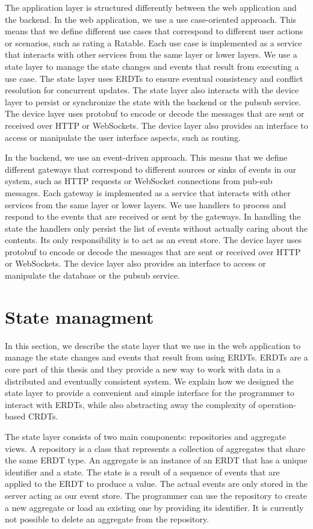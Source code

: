 \documentclass[
	english,
	ruledheaders=section,   %
	class=report,		    %
	thesis={type=bachelor}, %
	accentcolor=9c,			%
	custommargins=true,    %
	marginpar=false,        %
	parskip=half-,          %
	fontsize=11pt,          %
]{tudapub}
\begin{document}
The application layer is structured differently between the web application and the backend. In the web application, we use a use case-oriented approach. This means that we define different use cases that correspond to different user actions or scenarios, such as rating a Ratable. Each use case is implemented as a service that interacts with other services from the same layer or lower layers. We use a state layer to manage the state changes and events that result from executing a use case. The state layer uses ERDTs to ensure eventual consistency and conflict resolution for concurrent updates. The state layer also interacts with the device layer to persist or synchronize the state with the backend or the pubsub service. The device layer uses protobuf to encode or decode the messages that are sent or received over HTTP or WebSockets. The device layer also provides an interface to access or manipulate the user interface aspects, such as routing.

In the backend, we use an event-driven approach. This means that we define different gateways that correspond to different sources or sinks of events in our system, such as HTTP requests or WebSocket connections from pub-sub messages. Each gateway is implemented as a service that interacts with other services from the same layer or lower layers. We use handlers to process and respond to the events that are received or sent by the gateways. In handling the state the handlers only persist the list of events without actually caring about the contents. Its only responsibility is to act as an event store. The device layer uses protobuf to encode or decode the messages that are sent or received over HTTP or WebSockets. The device layer also provides an interface to access or manipulate the database or the pubsub service.

\section{State managment}
In this section, we describe the state layer that we use in the web application to manage the state changes and events that result from using ERDTs. ERDTs are a core part of this thesis and they provide a new way to work with data in a distributed and eventually consistent system. We explain how we designed the state layer to provide a convenient and simple interface for the programmer to interact with ERDTs, while also abstracting away the complexity of operation-based CRDTs.

The state layer consists of two main components: repositories and aggregate views. A repository is a class that represents a collection of aggregates that share the same ERDT type. An aggregate is an instance of an ERDT that has a unique identifier and a state. The state is a result of a sequence of events that are applied to the ERDT to produce a value. The actual events are only stored in the server acting as our event store. The programmer can use the repository to create a new aggregate or load an existing one by providing its identifier. It is currently not possible to delete an aggregate from the repository.
\end{document}
